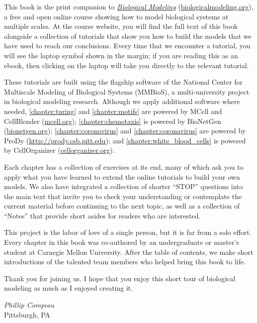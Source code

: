 This book is the print companion to \href{https://biologicalmodeling.org}{\textit{Biological Modeling}} (\href{https://biologicalmodeling.org}{biologicalmodeling.org}), a free and open online course showing how to model biological systems at multiple scales. At the course website, you will find the full text of this book alongside a collection of tutorials that show you how to build the models that we have used to reach our conclusions. Every time that we encounter a tutorial, you will see the laptop symbol shown in the margin; if you are reading this as an ebook, then clicking on the laptop will take you directly to the relevant tutorial.\tutorial[]

These tutorials are built using the flagship software of the National Center for Multiscale Modeling of Biological Systems (MMBioS), a multi-university project in biological modeling research. Although we apply additional software where needed, \autoref{chapter:turing} and \autoref{chapter:motifs} are powered by MCell and CellBlender (\url{mcell.org}); \autoref{chapter:chemotaxis} is powered by BioNetGen (\url{bionetgen.org}); \autoref{chapter:coronavirus} and \autoref{chapter:coronavirus} are powered by ProDy (\url{http://prody.csb.pitt.edu}); and \autoref{chapter:white_blood_cells} is powered by CellOrganizer (\url{cellorganizer.org}).

Each chapter has a collection of exercises at its end, many of which ask you to apply what you have learned to extend the online tutorials to build your own models. We  also have integrated a collection of shorter ``STOP'' questions into the main text that invite you to check your understanding or contemplate the current material before continuing to the next topic, as well as a collection of ``Notes'' that provide short asides for readers who are interested.

This project is the labor of love of a single person, but it is far from a solo effort. Every chapter in this book was co-authored by an undergraduate or master's student at Carnegie Mellon University. After the table of contents, we make short introductions of the talented team members who helped bring this book to life.

Thank you for joining us. I hope that you enjoy this short tour of biological modeling as much as I enjoyed creating it.

\begin{flushright}
\textit{Phillip Compeau}\\
{Pittsburgh, PA}
\end{flushright}

